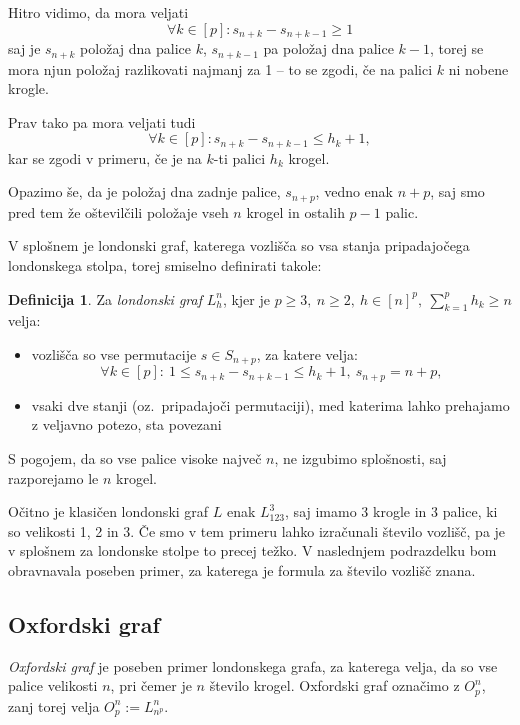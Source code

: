 \documentclass[12pt,a4paper]{amsart}
\theoremstyle{definition} %
\newtheorem{definicija}{Definicija}[section]
\theoremstyle{plain} %
\begin{document}
Hitro vidimo, da mora veljati 
\[\forall k \in [p]\colon s_{n+k} - s_{n+k-1} \geq 1 \]
saj je $s_{n+k}$ položaj dna palice $k$, $s_{n+k-1}$ pa položaj dna palice $k-1$, torej se mora njun položaj razlikovati najmanj za 1 -- to se zgodi, če na palici $k$ ni nobene krogle.

Prav tako pa mora veljati tudi 
\[\forall k \in [p]\colon s_{n+k} - s_{n+k-1} \leq h_k + 1,\]
kar se zgodi v primeru, če je na $k$-ti palici $h_k$ krogel.

Opazimo še, da je položaj dna zadnje palice, $s_{n+p}$, vedno enak $n+p$, saj smo pred tem že oštevilčili položaje vseh $n$ krogel in ostalih $p-1$ palic.

V splošnem je londonski graf, katerega vozlišča so vsa stanja pripadajočega londonskega stolpa, torej smiselno definirati takole:

\begin{definicija}
    Za \emph{londonski graf} $L_h^n$, kjer je $p \geq 3,\ n \geq 2,\ h \in [n]^p,\  \sum_{k=1}^p h_k \geq n$ velja:
    \begin{itemize}
        \item vozlišča so vse permutacije $s \in S_{n+p}$, za katere velja:
        \[\forall k \in [p]:\ 1 \leq s_{n+k} - s_{n+k-1} \leq h_k + 1,\ s_{n+p} = n + p ,\]
        \item vsaki dve stanji (oz.\ pripadajoči permutaciji), med katerima lahko prehajamo z veljavno potezo, sta povezani
    \end{itemize}
\end{definicija}

S pogojem, da so vse palice visoke največ $n$, ne izgubimo splošnosti, saj razporejamo le $n$ krogel.

Očitno je klasičen londonski graf $L$ enak $L_{123}^3$, saj imamo 3 krogle in 3 palice, ki so velikosti 1, 2 in 3.
Če smo v tem primeru lahko izračunali število vozlišč, pa je v splošnem za londonske stolpe to precej težko. V naslednjem podrazdelku bom obravnavala poseben primer, za katerega je formula za število vozlišč znana. 

\subsection{Oxfordski graf}

\emph{Oxfordski graf} je poseben primer londonskega grafa, za katerega velja, da so vse palice velikosti $n$, pri čemer je $n$ število krogel. Oxfordski graf označimo z $O^n_p$, zanj torej velja $O^n_p := L^n_{n^p}$.
\end{document}
